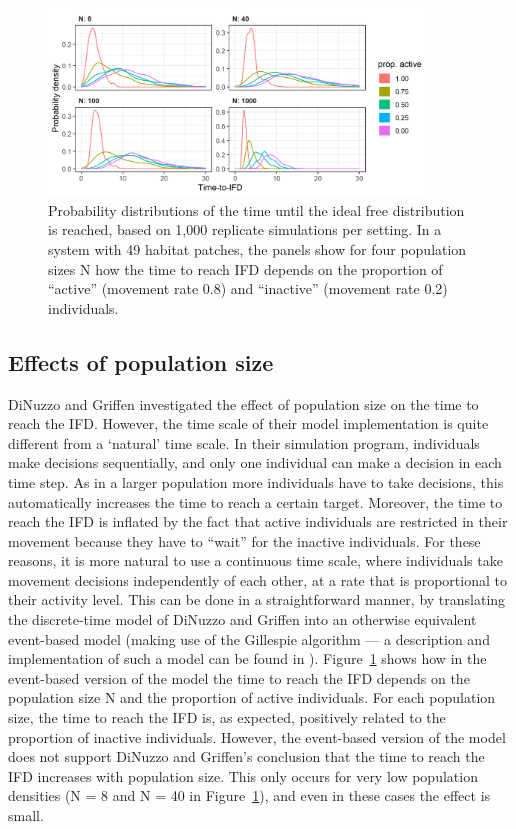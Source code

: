 \begin{interludeenv}
	\begin{figure}[!h]
		\centering
		\includegraphics[width=0.9\textwidth]{figures/boxes/details3.png}
		\caption{
			Probability distributions of the time until the ideal free distribution is reached, based on 1,000 replicate simulations per setting. 
			In a system with 49 habitat patches, the panels show for four population sizes N how the time to reach IFD depends on the proportion of ``active'' (movement rate 0.8) and ``inactive'' (movement rate 0.2) individuals.
		}\label{fig_details_03}
	\end{figure}

	\subsection*{Effects of population size}
	
	DiNuzzo and Griffen investigated the effect of population size on the time to reach the IFD.
	However, the time scale of their model implementation is quite different from a `natural' time scale.
	In their simulation program, individuals make decisions sequentially, and only one individual can make a decision in each time step.
	As in a larger population more individuals have to take decisions, this automatically increases the time to reach a certain target.
	Moreover, the time to reach the IFD is inflated by the fact that active individuals are restricted in their movement because they have to ``wait'' for the inactive individuals.
	For these reasons, it is more natural to use a continuous time scale, where individuals take movement decisions independently of each other, at a rate that is proportional to their activity level.
	This can be done in a straightforward manner, by translating the discrete-time model of DiNuzzo and Griffen into an otherwise equivalent event-based model (making use of the Gillespie algorithm  --- a description and implementation of such a model can be found in \textcite{netz2021a}).
	Figure~\ref{fig_details_03} shows how in the event-based version of the model the time to reach the IFD depends on the population size N and the proportion of active individuals.
	For each population size, the time to reach the IFD is, as expected, positively related to the proportion of inactive individuals.
	However, the event-based version of the model does not support DiNuzzo and Griffen's conclusion that the time to reach the IFD increases with population size.
	This only occurs for very low population densities (N = 8 and N = 40 in Figure~\ref{fig_details_03}), and even in these cases the effect is small.


\end{interludeenv}
